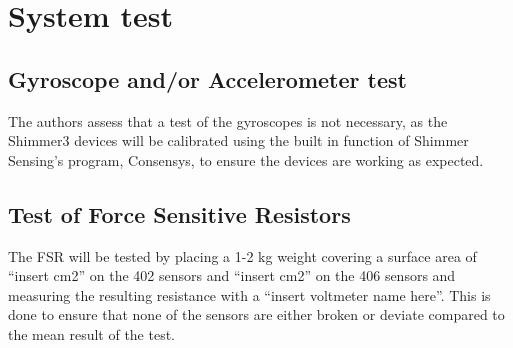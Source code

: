 \section{System test}


\subsection{Gyroscope and/or Accelerometer test}
The authors assess that a test of the gyroscopes is not necessary, as the Shimmer3 devices will be calibrated using the built in function of Shimmer Sensing’s program, Consensys, to ensure the devices are working as expected.





\subsection{Test of Force Sensitive Resistors}
The FSR will be tested by placing a 1-2 kg weight covering a surface area of “insert cm2” on the 402 sensors and “insert cm2” on the 406 sensors and measuring the resulting resistance with a “insert voltmeter name here”. This is done to ensure that none of the sensors are either broken or deviate compared to the mean result of the test. 







